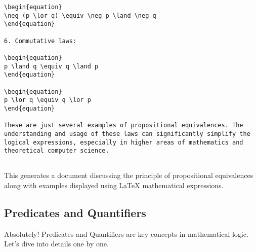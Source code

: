 \begin{verbatim}
\begin{equation}
\neg (p \lor q) \equiv \neg p \land \neg q
\end{equation}

6. Commutative laws:

\begin{equation}
p \land q \equiv q \land p
\end{equation}

\begin{equation}
p \lor q \equiv q \lor p
\end{equation}

These are just several examples of propositional equivalences. The understanding and usage of these laws can significantly simplify the logical expressions, especially in higher areas of mathematics and theoretical computer science.


\end{verbatim}
This generates a document discussing the principle of propositional equivalences along with examples displayed using LaTeX mathematical expressions.

\subsection{Predicates and Quantifiers}
Absolutely! Predicates and Quantifiers are key concepts in mathematical logic. Let's dive into details one by one.

